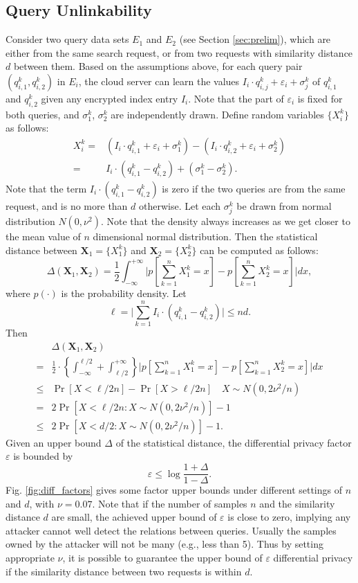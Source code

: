 \documentclass{IEEEtran}
\begin{document}
\subsection{Query Unlinkability}
Consider two query data sets $E_1$ and $E_2$ (see Section \ref{sec:prelim}), which are either from the same search request, or from two requests with similarity distance $d$ between them. Based on the assumptions above, for each query pair $(q_{i,1}^k,q_{i,2}^k)$ in $E_i$, the cloud server can learn the values $I_i\cdot q_{i,j}^k+\varepsilon_i+\sigma_j^k$ of $q_{i,1}^k$ and $q_{i,2}^k$ given any encrypted index entry $I_i$. Note that the part of $\varepsilon_i$ is fixed for both queries, and $\sigma_1^k$, $\sigma_2^k$ are independently drawn. Define random variables $\{X_i^k\}$ as follows:
$$
\begin{aligned}
X_i^k = &(I_i\cdot q_{i,1}^k+\varepsilon_i+\sigma_1^k) - (I_i\cdot q_{i,2}^k+\varepsilon_i+\sigma_2^k)\\
=&I_i\cdot(q_{i,1}^k-q_{i,2}^k)+(\sigma_1^k-\sigma_2^k).
\end{aligned}
$$
Note that the term $I_i\cdot(q_{i,1}^k-q_{i,2}^k)$ is zero if the two queries are from the same request, and is no more than $d$ otherwise. Let each $\sigma_j^k$ be drawn from normal distribution $N(0,\nu^2)$. Note that the density always increases as we get closer to the mean value of $n$ dimensional normal distribution. Then the statistical distance between $\mathbf{X}_1 = \{X_1^k\}$ and $\mathbf{X}_2 = \{X_2^k\}$ can be computed as follows:
$$\Delta(\mathbf{X}_1, \mathbf{X}_2) = \frac{1}{2}\int_{-\infty}^{+\infty}\bigg|p[\sum_{k=1}^n X_1^k = x] - p[\sum_{k=1}^n X_2^k = x]\bigg|dx,$$
where $p(\cdot)$ is the probability density. Let 
$$\ell = \bigg| \sum_{k=1}^n I_i\cdot(q_{i,1}^k-q_{i,2}^k) \bigg| \leq nd.$$
Then
$$
\begin{aligned}
&\Delta(\mathbf{X}_1, \mathbf{X}_2) \\
=& \frac{1}{2}\cdot\left\{ \int_{-\infty}^{\ell/2} + \int_{\ell/2}^{+\infty} \right\} \bigg|p[\sum_{k=1}^n X_1^k = x] - p[\sum_{k=1}^n X_2^k = x]\bigg|dx \\
\leq& \Pr[X<\ell/2n] - \Pr[X>\ell/2n] \quad X\sim N(0,2\nu^2/n) \\
=& 2\Pr[X<\ell/2n: X\sim N(0,2\nu^2/n)]-1 \\
\leq& 2\Pr[X<d/2: X\sim N(0,2\nu^2/n)]-1.
\end{aligned}
$$
Given an upper bound $\Delta$ of the statistical distance, the differential privacy factor $\varepsilon$ is bounded by
$$\varepsilon \leq \log \frac{1+\Delta}{1-\Delta}.$$
Fig. \ref{fig:diff_factors} gives some factor upper bounds under different settings of $n$ and $d$, with $\nu=0.07$. Note that if the number of samples $n$ and the similarity distance $d$ are small, the achieved upper bound of $\varepsilon$ is close to zero, implying any attacker cannot well detect the relations between queries. Usually the samples owned by the attacker will not be many (e.g., less than 5). Thus by setting appropriate $\nu$, it is possible to guarantee the upper bound of $\varepsilon$ differential privacy if the similarity distance between two requests is within $d$.
\end{document}
